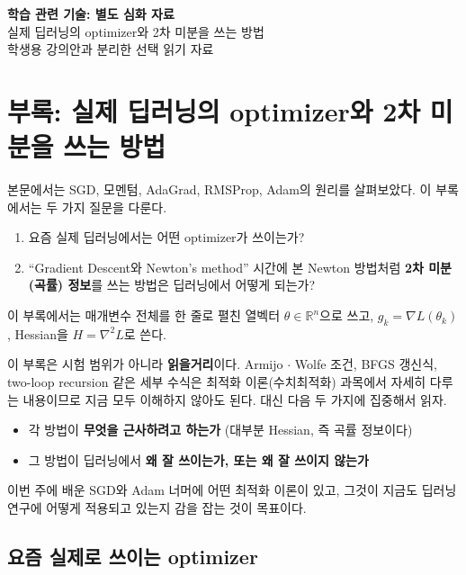 \documentclass[11pt,a4paper]{article}
\newcommand{\R}{\mathbb{R}}
\begin{document}
\begin{center}
{\LARGE\bfseries 학습 관련 기술: 별도 심화 자료}\\[0.4em]
{\large 실제 딥러닝의 optimizer와 2차 미분을 쓰는 방법}\\[0.4em]
{\normalsize 학생용 강의안과 분리한 선택 읽기 자료}
\end{center}
\appendix

\section{부록: 실제 딥러닝의 optimizer와 2차 미분을 쓰는 방법}\label{app:opt}

본문에서는 SGD, 모멘텀, AdaGrad, RMSProp, Adam의 원리를 살펴보았다.
이 부록에서는 두 가지 질문을 다룬다.
\begin{enumerate}[label=(\arabic*)]
\item 요즘 실제 딥러닝에서는 어떤 optimizer가 쓰이는가?
\item ``Gradient Descent와 Newton's method'' 시간에 본 Newton 방법처럼
\textbf{2차 미분(곡률) 정보}를 쓰는 방법은 딥러닝에서 어떻게 되는가?
\end{enumerate}
이 부록에서는 매개변수 전체를 한 줄로 펼친 열벡터 $\theta\in\R^n$으로 쓰고,
$g_k=\nabla L(\theta_k)$, Hessian을 $H=\nabla^2L$로 쓴다.

\begin{remarkbox}[이 부록을 읽는 방법]
이 부록은 시험 범위가 아니라 \textbf{읽을거리}이다.
Armijo $\cdot$ Wolfe 조건, BFGS 갱신식, two-loop recursion 같은 세부 수식은
최적화 이론(수치최적화) 과목에서 자세히 다루는 내용이므로 지금 모두 이해하지 않아도 된다.
대신 다음 두 가지에 집중해서 읽자.
\begin{itemize}[leftmargin=1.5em]
\item 각 방법이 \textbf{무엇을 근사하려고 하는가} (대부분 Hessian, 즉 곡률 정보이다)
\item 그 방법이 딥러닝에서 \textbf{왜 잘 쓰이는가, 또는 왜 잘 쓰이지 않는가}
\end{itemize}
이번 주에 배운 SGD와 Adam 너머에 어떤 최적화 이론이 있고,
그것이 지금도 딥러닝 연구에 어떻게 적용되고 있는지 감을 잡는 것이 목표이다.
\end{remarkbox}

\subsection{요즘 실제로 쓰이는 optimizer}
\end{document}
